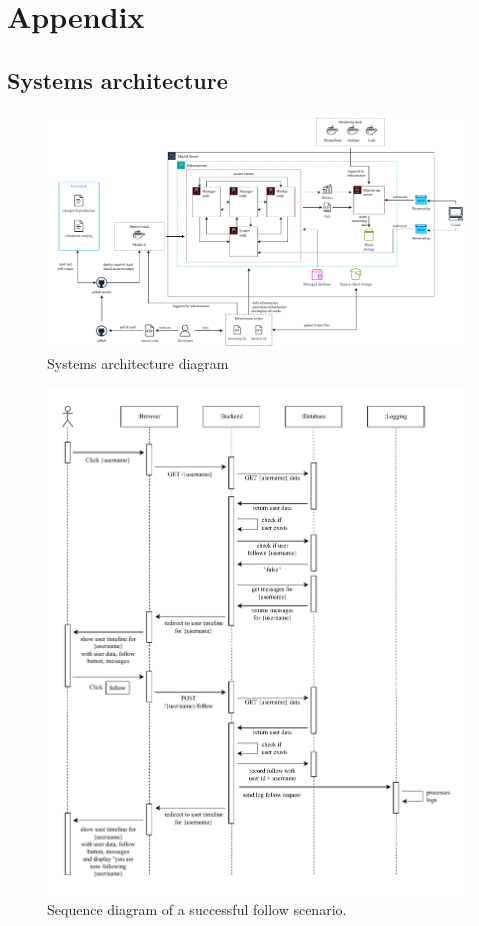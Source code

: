 \section{Appendix}
\subsection{Systems architecture}
\label{apendix:systems-architecture}

\begin{figure}[ht]
    \centering
    \includegraphics[height=0.8\textwidth, angle=90]{figures/devops-architecture-architecture_v2.pdf}
    \caption{Systems architecture diagram}
    \label{fig:systems-architecture}
\end{figure}


\begin{figure}[t!]
  \begin{center}
\includegraphics[width=\textwidth]{figures/Sequence_follow_succes.pdf}
    \caption{Sequence diagram of a successful follow scenario.}
    \label{fig:architecture}
  \end{center}
\end{figure}
